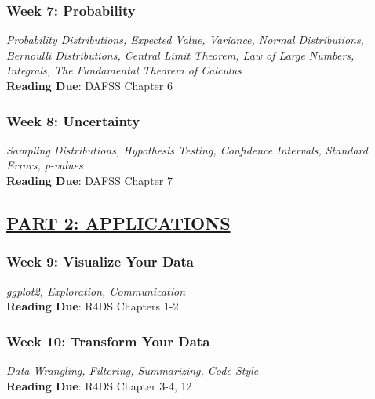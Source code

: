 \documentclass[11pt, letterpaper]{article}
\begin{document}


\subsubsection*{Week 7: Probability}
\textit{Probability Distributions, Expected Value, Variance, Normal Distributions, Bernoulli Distributions, Central Limit Theorem, Law of Large Numbers, Integrals, The Fundamental Theorem of Calculus}\\
\textbf{Reading Due}: DAFSS Chapter 6

\subsubsection*{Week 8: Uncertainty}
\textit{Sampling Distributions, Hypothesis Testing, Confidence Intervals, Standard Errors, p-values}\\
\textbf{Reading Due}: DAFSS Chapter 7


\subsection*{\underline{PART 2: APPLICATIONS}}

\subsubsection*{Week 9: Visualize Your Data}
\textit{ggplot2, Exploration, Communication}\\
\textbf{Reading Due}: R4DS Chapters 1-2

\subsubsection*{Week 10: Transform Your Data}
\textit{Data Wrangling, Filtering, Summarizing, Code Style}\\
\textbf{Reading Due}: R4DS Chapter 3-4, 12
\end{document}
